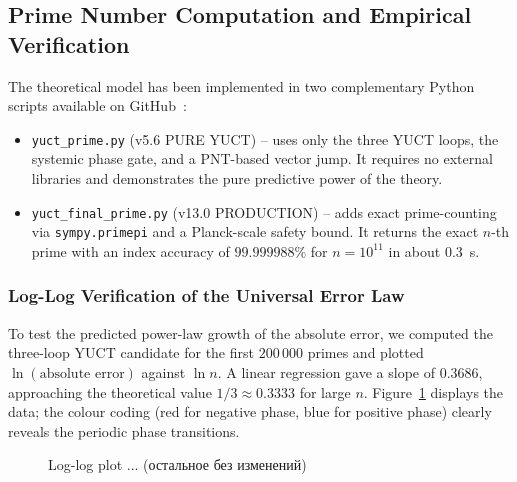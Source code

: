 \documentclass[12pt,a4paper]{article}
\theoremstyle{remark}
\begin{document}
	\subsection{Prime Number Computation and Empirical Verification}
	\label{sec:prime-empirical}
	
	The theoretical model has been implemented in two complementary Python scripts
	available on GitHub~\cite{PrimeRepo}:
	\begin{itemize}
		\item \texttt{yuct\_prime.py} (v5.6 PURE YUCT) -- uses only the three YUCT loops, the systemic phase gate, and a PNT-based vector jump.  It requires no external libraries and demonstrates the pure predictive power of the theory.
		\item \texttt{yuct\_final\_prime.py} (v13.0 PRODUCTION) -- adds exact prime-counting via \texttt{sympy.primepi} and a Planck-scale safety bound.  It returns the exact \(n\)-th prime with an index accuracy of \(99.999988\%\) for \(n=10^{11}\) in about \(0.3\)~s.
	\end{itemize}
	
	\subsubsection{Log-Log Verification of the Universal Error Law}
	
	To test the predicted power-law growth of the absolute error, we computed the
	three-loop YUCT candidate for the first \(200\,000\) primes and plotted
	\(\ln(\text{absolute error})\) against \(\ln n\).  A linear regression gave
	a slope of \(0.3686\), approaching the theoretical value \(1/3 \approx 0.3333\)
	for large \(n\).  Figure~\ref{fig:loglog} displays the data; the colour coding
	(red for negative phase, blue for positive phase) clearly reveals the periodic
	phase transitions.
	
	\begin{figure}[htbp]
		\centering
		\caption{Log-log plot ... (остальное без изменений)}
		\label{fig:loglog}
	\end{figure}
	
\end{document}
